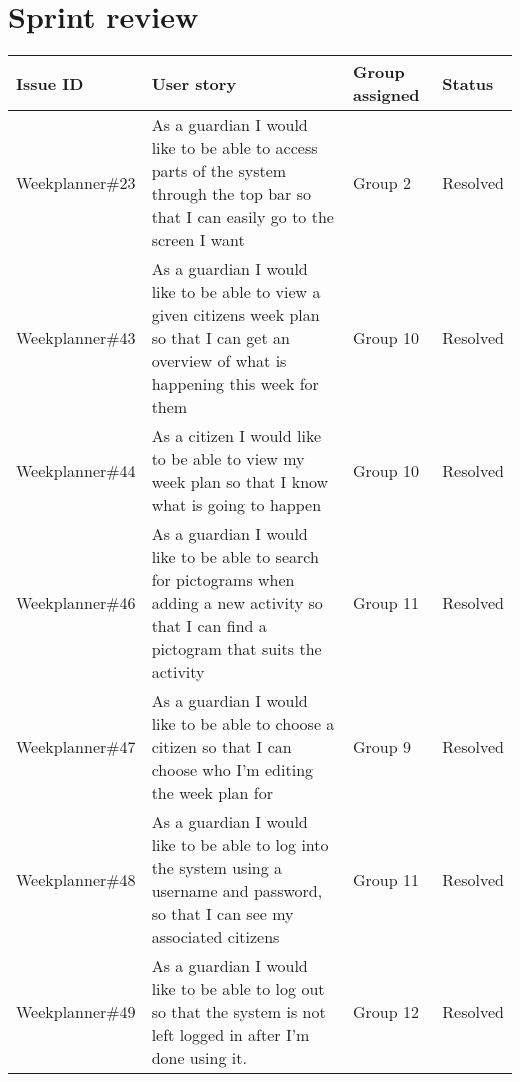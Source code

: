 \section{Sprint review}
\begin{table}[!ht]
    \small
    \begin{tabular}{|p{2.8cm}|p{7cm}|p{1.5cm}|p{1.5cm}|}
    \hline
    Issue ID        & User story                                                                                                                                                                               & Group assigned  & Status     \\ \hline
    Weekplanner\#23 & As a guardian I would like to be able to access parts of the system through the top bar so that I can easily go to the screen I want                                                     & Group 2         & Resolved      \\ \hline
    Weekplanner\#43 & As a guardian I would like to be able to view a given citizens week plan so that I can get an overview of what is happening this week for them                                           & Group 10        & Resolved      \\ \hline
    Weekplanner\#44 & As a citizen I would like to be able to view my week plan so that I know what is going to happen                                                                                         & Group 10        & Resolved     \\ \hline
    Weekplanner\#46 & As a guardian I would like to be able to search for pictograms when adding a new activity so that I can find a pictogram that suits the activity                                         & Group 11        & Resolved   \\ \hline
    Weekplanner\#47 & As a guardian I would like to be able to choose a citizen so that I can choose who I’m editing the week plan for                                                                         & Group 9         & Resolved   \\ \hline
    Weekplanner\#48 & As a guardian I would like to be able to log into the system using a username and password, so that I can see my associated citizens                                                     & Group 11        & Resolved  \\ \hline
    Weekplanner\#49 & As a guardian I would like to be able to log out so that the system is not left logged in after I’m done using it.                                                                       & Group 12        & Resolved     \\ \hline

\end{tabular}
\end{table}
